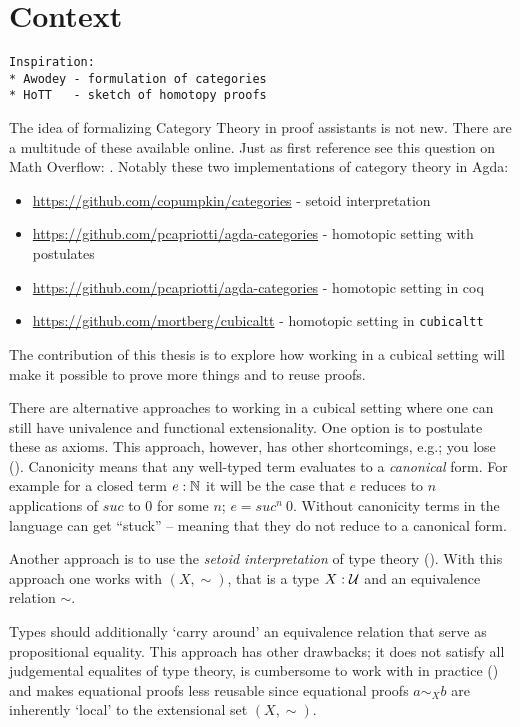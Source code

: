 \section{Context}
%
\begin{verbatim}
Inspiration:
* Awodey - formulation of categories
* HoTT   - sketch of homotopy proofs
\end{verbatim}
The idea of formalizing Category Theory in proof assistants is not new. There
are a multitude of these available online. Just as first reference see this
question on Math Overflow: \cite{mo-formalizations}. Notably these two implementations of category theory in Agda:
\begin{itemize}
\item
\url{https://github.com/copumpkin/categories} - setoid interpretation
\item
\url{https://github.com/pcapriotti/agda-categories} - homotopic setting with postulates
\item
\url{https://github.com/pcapriotti/agda-categories} - homotopic setting in coq
\item
\url{https://github.com/mortberg/cubicaltt} - homotopic setting in \texttt{cubicaltt}
\end{itemize}
The contribution of this
thesis is to explore how working in a cubical setting will make it possible to
prove more things and to reuse proofs.

There are alternative approaches to working in a cubical setting where one can
still have univalence and functional extensionality. One option is to postulate
these as axioms. This approach, however, has other shortcomings, e.g.; you lose
 (\cite{huber-2016}). Canonicity means that any well-typed
term evaluates to a \emph{canonical} form. For example for a closed term $e :
\mathbb{N}$ it will be the case that $e$ reduces to $n$ applications of $\mathit{suc}$
to $0$ for some $n$; $e = \mathit{suc}^n\ 0$. Without canonicity terms in the
language can get ``stuck'' -- meaning that they do not reduce to a canonical
form.

Another approach is to use the \emph{setoid interpretation} of type theory
(\cite{hofmann-1995,huber-2016}). With this approach one works with
 $(X, \sim)$, that is a type $X \;\mathord{:}\; \mathcal{U}$ and an
equivalence relation $\sim$.

Types should additionally `carry around' an equivalence relation that serve as
propositional equality. This approach has other drawbacks; it does not satisfy
all judgemental equalites of type theory, is cumbersome to work with in practice
(\cite[p. 4]{huber-2016}) and makes equational proofs less reusable since
equational proofs $a \sim_{X} b$ are inherently `local' to the extensional set
$(X , \sim)$.
%

